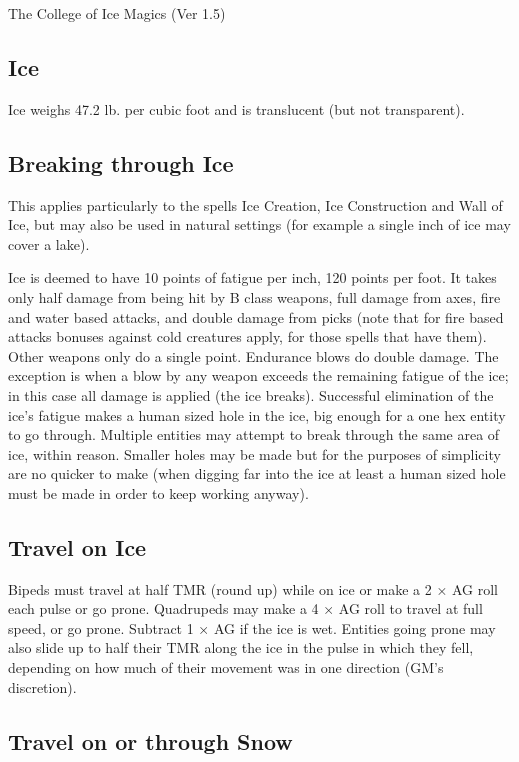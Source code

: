 \begin{Chapter}{The College of Ice Magics (Ver 1.5)}
\subsection{Ice}

Ice weighs 47.2 lb. per cubic foot and is translucent 
(but not transparent). 

\subsection{Breaking through Ice}

This applies particularly to the spells Ice Creation, Ice Construction
and Wall of Ice, but may also be used in natural settings (for example
a single inch of ice may cover a lake).

Ice is deemed to have 10 points of fatigue per inch, 120 points per
foot. It takes only half damage from being hit by B class weapons,
full damage from axes, fire and water based attacks, and double damage
from picks (note that for fire based attacks bonuses against cold
creatures apply, for those spells that have them).  Other weapons only
do a single point.  Endurance blows do double damage.  The exception
is when a blow by any weapon exceeds the remaining fatigue of the ice;
in this case all damage is applied (the ice breaks).  Successful
elimination of the ice’s fatigue makes a human sized hole in the ice,
big enough for a one hex entity to go through.  Multiple entities may
attempt to break through the same area of ice, within reason.  Smaller
holes may be made but for the purposes of simplicity are no quicker to
make (when digging far into the ice at least a human sized hole must
be made in order to keep working anyway).

\subsection{Travel on Ice}

Bipeds must travel at half TMR (round up) while on ice or make a 2 ×
AG roll each pulse or go prone.  Quadrupeds may make a 4 × AG roll to
travel at full speed, or go prone. Subtract 1 × AG if the ice is wet.
Entities going prone may also slide up to half their TMR along the ice
in the pulse in which they fell, depending on how much of their
movement was in one direction (GM’s discretion).

\subsection{Travel on or through Snow}


\end{Chapter}

